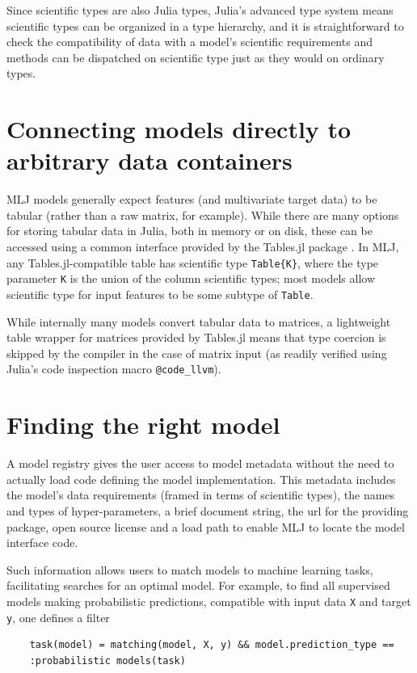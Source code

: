 \documentclass{article}
\begin{document}
Since scientific types are also Julia types, Julia's advanced type system means scientific types can be organized in a type hierarchy, and it is straightforward to check the compatibility of data with a model's scientific requirements and methods can be dispatched on scientific type just as they would on ordinary types.

\section{Connecting models directly to arbitrary data containers}

MLJ models generally expect features (and multivariate target data) to be tabular (rather than a raw matrix, for example). While there are many options for storing tabular data in Julia, both in memory or on disk, these can be accessed using a common interface provided by the Tables.jl package \cite{Quinn}. In MLJ, any Tables.jl-compatible table has scientific type \texttt{Table\{K\}}, where the type parameter \texttt{K} is the union of the column scientific types; most models allow scientific type for input features to be some subtype of \texttt{Table}.

While internally many models convert tabular data to matrices, a lightweight table wrapper for matrices provided by Tables.jl means that type coercion is skipped by the compiler in the case of matrix input (as readily verified using Julia's code inspection macro \texttt{@code\_llvm}).

\section{Finding the right model}

A model registry gives the user access to model metadata without the need to actually load code defining the model implementation. This metadata includes the model's data requirements (framed in terms of scientific types), the names and types of hyper-parameters, a brief document string, the url for the providing package, open source license and a load path to enable MLJ to locate the model interface code.

Such information allows users to match models to machine learning tasks, facilitating searches for an optimal model. For example, to find all supervised models making probabilistic predictions, compatible with input data \texttt{X} and target \texttt{y}, one defines a filter

\begin{verbatim}
    task(model) = matching(model, X, y) && model.prediction_type == 
    :probabilistic models(task)
\end{verbatim}
\end{document}
